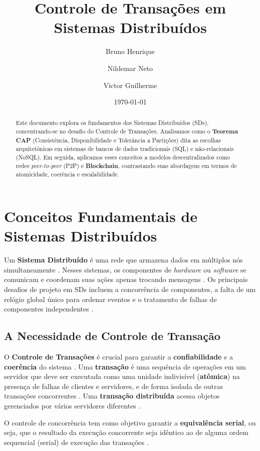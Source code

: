 \documentclass[a4paper,12pt]{article}
\title{Controle de Transações em Sistemas Distribuídos}
\author{Bruno Henrique \and Nildemar Neto \and Victor Guilherme}
\date{\today}
\begin{document}
\maketitle

\begin{abstract}
Este documento explora os fundamentos dos Sistemas Distribuídos (SDs), concentrando-se no desafio do Controle de Transações.
Analisamos como o \textbf{Teorema CAP} (Consistência, Disponibilidade e Tolerância a Partições) dita as escolhas arquitetônicas em sistemas de bancos de dados tradicionais (SQL) e não-relacionais (NoSQL).
Em seguida, aplicamos esses conceitos a modelos descentralizados como redes \textit{peer-to-peer} (P2P) e \textbf{Blockchain}, contrastando suas abordagens em termos de atomicidade, coerência e escalabilidade.
\end{abstract}

\section{Conceitos Fundamentais de Sistemas Distribuídos}
Um \textbf{Sistema Distribuído} é uma rede que armazena dados em múltiplos nós simultaneamente \cite{61}.
Nesses sistemas, os componentes de \textit{hardware} ou \textit{software} se comunicam e coordenam suas ações apenas trocando mensagens \cite{91}.
Os principais desafios de projeto em SDs incluem a concorrência de componentes, a falta de um relógio global único para ordenar eventos e o tratamento de falhas de componentes independentes \cite{91, 106}.

\subsection{A Necessidade de Controle de Transação}
O \textbf{Controle de Transações} é crucial para garantir a \textbf{confiabilidade} e a \textbf{coerência} do sistema \cite{374}.
Uma \textbf{transação} é uma sequência de operações em um servidor que deve ser executada como uma unidade indivisível (\textbf{atômica}) na presença de falhas de clientes e servidores, e de forma isolada de outras transações concorrentes \cite{348, 373}.
Uma \textbf{transação distribuída} acessa objetos gerenciados por vários servidores diferentes \cite{406}.

O controle de concorrência tem como objetivo garantir a \textbf{equivalência serial}, ou seja, que o resultado da execução concorrente seja idêntico ao de alguma ordem sequencial (serial) de execução das transações \cite{378}.
\end{document}
